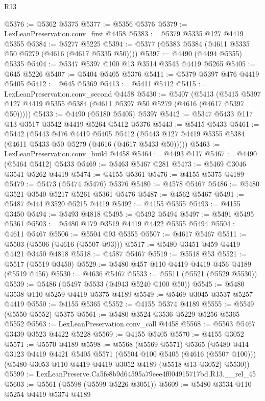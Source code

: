\begin{lexlean}{R13}
\begin{coremodule}
@5376 := @5362 @5375
@5377 := @5356 @5376
@5379 := LexLeanPreservation.conv_first @4458
@5383 := @5379 @5335 @127 @4419 @5355
@5384 := @5277 @5225
@5394 := @5377 (@5383 @5384 (@4611 @5335 @50 @5279 (@4616 (@4617 @5335 @50))))
@5397 := @4490 (@4494 @5355) @5335
@5404 := @5347 @5397 @100 @13 @3514 @3543 @4419 @5265
@5405 := @645 @5226
@5407 := @5404 @5405 @5376
@5411 := @5379 @5397 @476 @4419 @5405
@5412 := @645 @5369
@5413 := @5411 @5412
@5415 := LexLeanPreservation.conv_second @4458
@5430 := @5407
    (@5413 (@5415 @5397 @127 @4419 @5355 @5384 (@4611 @5397 @50 @5279 (@4616 (@4617 @5397 @50)))))
@5433 := @4490 (@5180 @5405) @5397
@5442 := @5347 @5433 @117 @13 @3517 @3542 @4419 @5264 @5412 @5376
@5443 := @5415 @5433
@5461 := @5442
    (@5443
      @476
      @4419
      @5405
      @5412
      (@5443 @127 @4419 @5355 @5384 (@4611 @5433 @50 @5279 (@4616 (@4617 @5433 @50)))))
@5463 := LexLeanPreservation.conv_build @4458
@5464 := @4493 @117
@5467 := @4490 (@5464 @5412) @5433
@5469 := @5463 @5467 @281
@5473 := @5469 @3046 @3541 @5262 @4419
@5474 := @4155 @5361
@5476 := @4155 @5375 @4189
@5479 := @5473 (@5474 @5476) @5376
@5480 := @4578 @5467
@5486 := @5480 @3521 @3540 @5217 @5261 @5361 @5476
@5487 := @4562 @5467
@5491 := @5487 @444 @3520 @5215 @4419
@5492 := @4155 @5355
@5493 := @4155 @3450
@5494 := @5493 @4818
@5495 := @5492 @5494
@5497 := @5491 @5495 @5361
@5503 := @5480 @179 @3519 @4419 @4422 @5355 @5494
@5504 := @4611 @5467
@5506 := @5504 @93 @5355
@5507 := @4617 @5467
@5511 := @5503 (@5506 (@4616 (@5507 @93)))
@5517 := @5480 @3451 @459 @4419 @4421 @3450 @4818
@5518 := @4587 @5467
@5519 := @5518 @53
@5521 := @5517 (@5519 @3450)
@5529 := @5480 @457 @110 @4419 @4419 @456 @4189 (@5519 @456)
@5530 := @4636 @5467
@5533 := @5511 (@5521 (@5529 @5530))
@5539 := @5486 (@5497 @5533 (@4943 @5240 @100 @50))
@5545 := @5480 @3538 @110 @5259 @4419 @5375 @4189
@5549 := @5469 @3045 @3537 @5257 @4419
@5550 := @4155 @5365
@5552 := @4155 @5374 @4189
@5555 := @5549 (@5550 @5552) @5375
@5561 := @5480 @3524 @3536 @5229 @5256 @5365 @5552
@5563 := LexLeanPreservation.conv_call @4458
@5568 := @5563 @5467 @3439 @3523 @4422 @5228
@5569 := @4155 @5405
@5570 := @4155 @3052
@5571 := @5570 @4189
@5598 := @5568
    (@5569 @5571)
    @5365
    (@5480
      @414
      @3123
      @4419
      @4421
      @5405
      @5571
      (@5504 @100 @5405 (@4616 (@5507 @100)))
      (@5480 @3053 @110 @4419 @4419 @3052 @4189 (@5518 @13 @3052) @5530))
@5599 := LexLeanPreserve.Ca5fe8b9d64595a79eee4f004915717bd.R13.__rel_45
@5603 := @5561 (@5598 (@5599 @5226 @3051))
@5609 := @5480 @3534 @110 @5254 @4419 @5374 @4189

\end{coremodule}
\end{lexlean}
